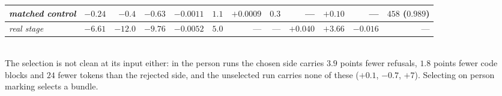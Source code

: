 \begin{table}[t]
\begin{tabular}{lrrrrrrrrrrr}
\textit{matched control} & $-0.24$ & $-0.4$ & $-0.63$ & $-0.0011$ & $1.1$ & $+0.0009$ & $0.3$ & --- & $+0.10$ & --- & $458$ ($0.989$) \\
\midrule
\textit{real stage} & $-6.61$ & $-12.0$ & $-9.76$ & $-0.0052$ & $5.0$ & --- & --- & $+0.040$ & $+3.66$ & $-0.016$ & --- \\
\bottomrule
\end{tabular}
\\[2pt]
\footnotesize
The selection is not clean at its input either: in the person runs the chosen
side carries $3.9$ points fewer refusals, $1.8$ points fewer code blocks and
$24$ fewer tokens than the rejected side, and the unselected run carries none
of these ($+0.1$, $-0.7$, $+7$). Selecting on person marking selects a bundle.
\end{table}
